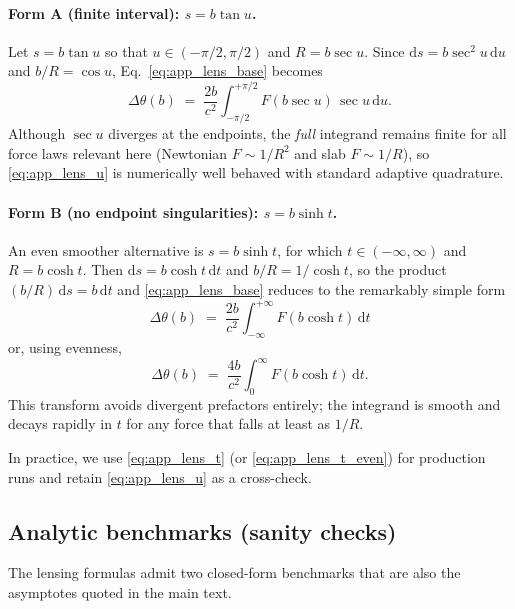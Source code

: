 \documentclass[11pt]{article}
\newcommand{\dd}{\mathrm{d}}
\begin{document}
\paragraph{Form A (finite interval): $s=b\tan u$.}
Let $s=b\tan u$ so that $u\in(-\pi/2,\pi/2)$ and $R=b\sec u$.  Since $\dd s=b\sec^2u\,\dd u$ and
$b/R=\cos u$, Eq.~\eqref{eq:app_lens_base} becomes
\begin{equation}
  \Delta\theta(b)
  \;=\;
  \frac{2b}{c^2}\int_{-\pi/2}^{+\pi/2} F\!\left(b\sec u\right)\,\sec u\,\dd u.
  \label{eq:app_lens_u}
\end{equation}
Although $\sec u$ diverges at the endpoints, the \emph{full} integrand remains finite for all force
laws relevant here (Newtonian $F\sim 1/R^2$ and slab $F\sim 1/R$), so \eqref{eq:app_lens_u} is
numerically well behaved with standard adaptive quadrature.

\paragraph{Form B (no endpoint singularities): $s=b\sinh t$.}
An even smoother alternative is $s=b\sinh t$, for which $t\in(-\infty,\infty)$ and
$R=b\cosh t$.  Then $\dd s=b\cosh t\,\dd t$ and $b/R=1/\cosh t$, so the product $(b/R)\,\dd s=b\,\dd t$
and \eqref{eq:app_lens_base} reduces to the remarkably simple form
\begin{equation}
  \boxed{
  \Delta\theta(b)
  \;=\;
  \frac{2b}{c^2}\int_{-\infty}^{+\infty} F\!\left(b\cosh t\right)\,\dd t
  }
  \label{eq:app_lens_t}
\end{equation}
or, using evenness,
\begin{equation}
  \Delta\theta(b)
  \;=\;
  \frac{4b}{c^2}\int_{0}^{\infty} F\!\left(b\cosh t\right)\,\dd t.
  \label{eq:app_lens_t_even}
\end{equation}
This transform avoids divergent prefactors entirely; the integrand is smooth and decays rapidly in
$t$ for any force that falls at least as $1/R$.

In practice, we use \eqref{eq:app_lens_t} (or \eqref{eq:app_lens_t_even}) for production runs and
retain \eqref{eq:app_lens_u} as a cross-check.

\subsection{Analytic benchmarks (sanity checks)}

The lensing formulas admit two closed-form benchmarks that are also the asymptotes quoted in the
main text.
\end{document}
